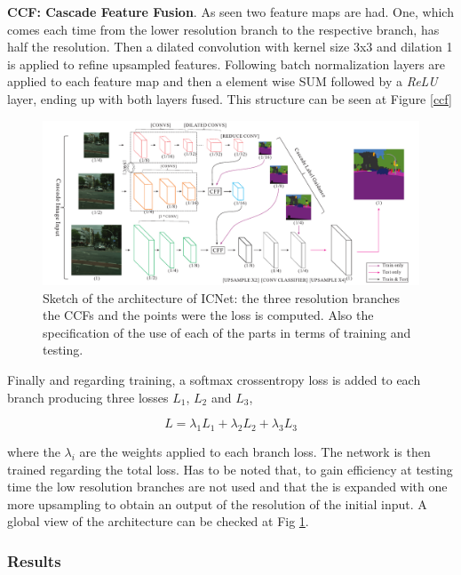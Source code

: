 \documentclass[12pt,a4paper]{article}
\begin{document}
\textbf{CCF: Cascade Feature Fusion}. As seen two feature maps are had. One, which comes each time from the lower resolution branch to the respective branch, has half the resolution. Then a dilated convolution with kernel size 3x3 and dilation 1 is applied to refine upsampled features. Following batch normalization layers are applied to each feature map and then a element wise SUM followed by a \textit{ReLU} layer, ending up with both layers fused. This structure can be seen at Figure \ref{ccf}\newline

\begin{figure}
\begin{center}
\includegraphics[scale=0.45]{icnet.png}
\caption{Sketch of the architecture of ICNet: the three resolution branches the CCFs and the points were the loss is computed. Also the specification of the use of each of the parts in terms of training and testing.}
\label{icnet}
\end{center}
\end{figure}

Finally and regarding training, a softmax crossentropy loss is added to each branch producing three losses $L_{1}$, $L_{2}$ and $L_{3}$,

\begin{equation*}
L = \lambda_{1}L_{1} + \lambda_{2}L_{2} + \lambda_{3}L_{3}
\end{equation*}

where the $\lambda_{i}$ are the weights applied to each branch loss. The network is then trained regarding the total loss. Has to be noted that, to gain efficiency at testing time  the low resolution branches are not used and that the is expanded with one more upsampling to obtain an output of the resolution of the initial input. A global view of the architecture can be checked at Fig \ref{icnet}.

\subsubsection{Results}
\end{document}
